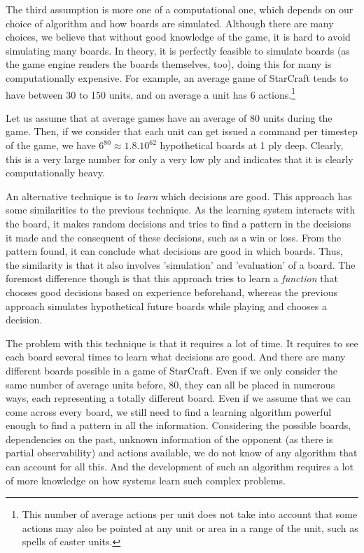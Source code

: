 The third assumption is more one of a computational one, which depends on our choice of algorithm and how boards are simulated. Although there are many choices, we believe that without good knowledge of the game, it is hard to avoid simulating many boards. In theory, it is perfectly feasible to simulate boards (as the game engine renders the boards themselves, too), doing this for many is computationally expensive. For example, an average game of StarCraft tends to have between 30 to 150 units, and on average a unit has 6 actions.\footnote{This number of average actions per unit does not take into account that some actions may also be pointed at any unit or area in a range of the unit, such as spells of caster units.}

Let us assume that at average games have an average of 80 units during the game. Then, if we consider that each unit can get issued a command per timestep of the game, we have $6^{80} \approx 1.8.10^{62}$ hypothetical boards at 1 ply deep. Clearly, this is a very large number for only a very low ply and indicates that it is clearly computationally heavy.

An alternative technique is to \emph{learn} which decisions are good. This approach has some similarities to the previous technique. As the learning system interacts with the board, it makes random decisions and tries to find a pattern in the decisions it made and the consequent of these decisions, such as a win or loss. From the pattern found, it can conclude what decisions are good in which boards. Thus, the similarity is that it also involves 'simulation' and 'evaluation' of a board. The foremost difference though is that this approach tries to learn a \emph{function} that chooses good decisions based on experience beforehand, whereas the previous approach simulates hypothetical future boards while playing and chooses a decision.

The problem with this technique is that it requires a lot of time. It requires to see each board several times to learn what decisions are good. And there are many different boards possible in a game of StarCraft. Even if we only consider the same number of average units before, 80, they can all be placed in numerous ways, each representing a totally different board. Even if we assume that we can come across every board, we still need to find a learning algorithm powerful enough to find a pattern in all the information. Considering the possible boards, dependencies on the past, unknown information of the opponent (as there is partial observability) and actions available, we do not know of any algorithm that can account for all this. And the development of such an algorithm requires a lot of more knowledge on how systems learn such complex problems.

